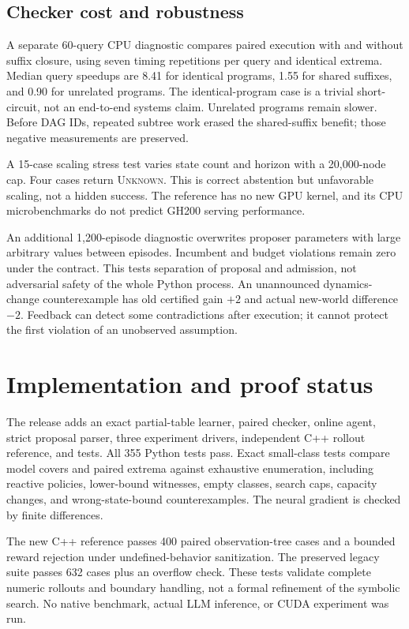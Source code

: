 \documentclass[10pt,twocolumn]{article}
\newcommand{\unk}{\textsc{Unknown}}
\begin{document}
\subsection{Checker cost and robustness}
A separate 60-query CPU diagnostic compares paired execution with and without
suffix closure, using seven timing repetitions per query and identical extrema.
Median query speedups are 8.41 for identical programs, 1.55 for shared suffixes,
and 0.90 for unrelated programs. The identical-program case is a trivial
short-circuit, not an end-to-end systems claim. Unrelated programs remain slower.
Before DAG IDs, repeated subtree work erased the shared-suffix benefit; those
negative measurements are preserved.

A 15-case scaling stress test varies state count and horizon with a 20,000-node
cap. Four cases return \unk. This is correct abstention but unfavorable scaling,
not a hidden success. The reference has no new GPU kernel, and its CPU
microbenchmarks do not predict GH200 serving performance.

An additional 1,200-episode diagnostic overwrites proposer parameters with large
arbitrary values between episodes. Incumbent and budget violations remain zero
under the contract. This tests separation of proposal and admission, not
adversarial safety of the whole Python process. An unannounced dynamics-change
counterexample has old certified gain $+2$ and actual new-world difference $-2$.
Feedback can detect some contradictions after execution; it cannot protect the
first violation of an unobserved assumption.

\section{Implementation and proof status}
The release adds an exact partial-table learner, paired checker, online agent,
strict proposal parser, three experiment drivers, independent C++ rollout
reference, and tests. All 355 Python tests pass. Exact small-class tests compare
model covers and paired extrema against exhaustive enumeration, including
reactive policies, lower-bound witnesses, empty classes, search caps, capacity
changes, and wrong-state-bound counterexamples. The neural gradient is checked
by finite differences.

The new C++ reference passes 400 paired observation-tree cases and a bounded
reward rejection under undefined-behavior sanitization. The preserved legacy
suite passes 632 cases plus an overflow check. These tests validate complete
numeric rollouts and boundary handling, not a formal refinement of the symbolic
search. No native benchmark, actual LLM inference, or CUDA experiment was run.
\end{document}
